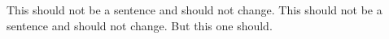 This should not be a sentence  and should not change.
This should not be a sentence  and should not change.
But this
one should.

